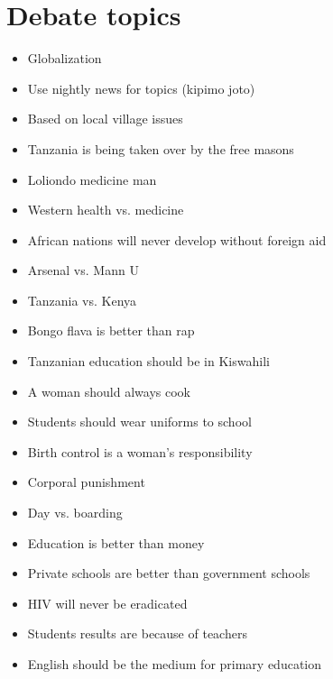 \section{Debate topics}
\begin{itemize}
\item Globalization 
\item Use nightly news for topics (kipimo joto)  
\item Based on local village issues  
\item Tanzania is being taken over by the free masons  
\item Loliondo medicine man 
\item Western health vs. medicine  
\item African nations will never develop without foreign aid  
\item Arsenal vs. Mann U  
\item Tanzania vs. Kenya  
\item Bongo flava is better than rap  
\item Tanzanian education should be in Kiswahili  
\item A woman should always cook  
\item Students should wear uniforms to school  
\item Birth control is a woman's responsibility  
\item Corporal punishment  
\item Day vs. boarding  
\item Education is better than money  
\item Private schools are better than government schools  
\item HIV will never be eradicated  
\item Students results are because of teachers  
\item English should be the medium for primary education 
\end{itemize}

